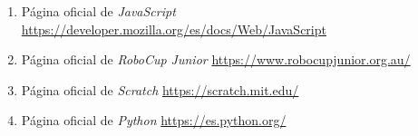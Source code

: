 \begin{enumerate}[1.]
\item Página oficial de \textit{JavaScript}\newline
\url{https://developer.mozilla.org/es/docs/Web/JavaScript}\newline

\item Página oficial de \textit{RoboCup Junior}\newline
\url{https://www.robocupjunior.org.au/}\newline

\item Página oficial de \textit{Scratch}\newline
\url{https://scratch.mit.edu/}\newline

\item Página oficial de \textit{Python}\newline
\url{https://es.python.org/}

\end{enumerate}